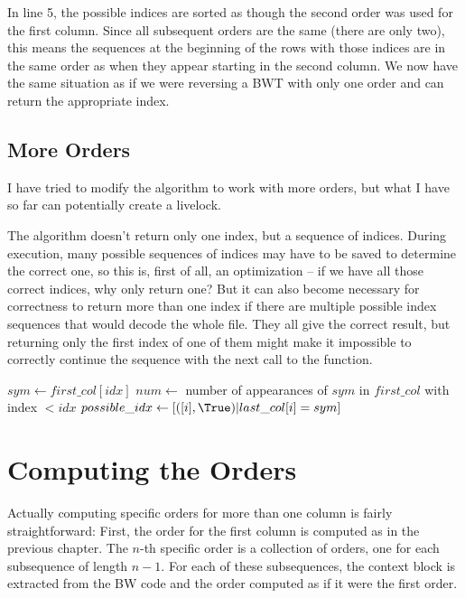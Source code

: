 \documentclass[a4paper]{scrreprt}
\begin{document}
In line 5, %
the possible indices are sorted as though the second order was used for the
first column. Since all subsequent orders are the same (there are only two),
this means the sequences at the beginning of the rows with those indices are in
the same order as when they appear starting in the second column. We now have
the same situation as if we were reversing a BWT with only one order and can
return the appropriate index.


\subsection{More Orders}

I have tried to modify the algorithm to work with more orders, but what I have
so far can potentially create a livelock.

The algorithm doesn't return only one index, but a sequence of indices. During
execution, many possible sequences of indices may have to be saved to
determine the correct one, so this is, first of all, an optimization -- if we
have all those correct indices, why only return one? But it can also become
necessary for correctness to return more than one index if there are multiple
possible index sequences that would decode the whole file. They all give the
correct result, but returning only the first index of one of them might make it
impossible to correctly continue the sequence with the next call to the
function.

\begin{algorithmic}[1]
\State $sym \gets first\_col[idx]$
\State $num \gets$ number of appearances of $sym$ in $first\_col$ with index $<
idx$
\State $possible\_idx \gets [([i], \True) | last\_col[i] = sym]$
\EndProcedure
\end{algorithmic}

\section{Computing the Orders}

Actually computing specific orders for more than one column is fairly
straightforward: First, the order for the first column is computed as in the
previous chapter. The \(n\)-th specific order is a collection of orders, one for
each subsequence of length \(n - 1\). For each of these subsequences, the
context block is extracted from the BW code and the order computed as if it were
the first order.
\end{document}
